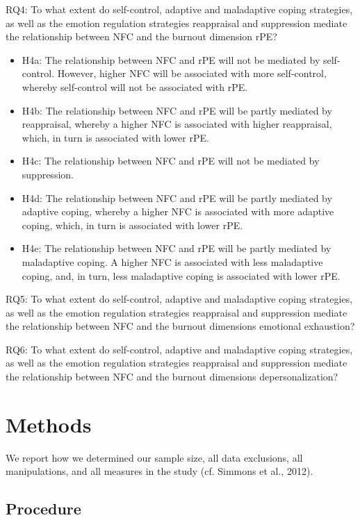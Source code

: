 \documentclass[
  english,
  man]{apa6}
\begin{document}
RQ4: To what extent do self-control, adaptive and maladaptive coping strategies, as well as the emotion regulation strategies reappraisal and suppression mediate the relationship between NFC and the burnout dimension rPE?

\begin{itemize}
\item
  H4a: The relationship between NFC and rPE will not be mediated by self-control. However, higher NFC will be associated with more self-control, whereby self-control will not be associated with rPE.
\item
  H4b: The relationship between NFC and rPE will be partly mediated by reappraisal, whereby a higher NFC is associated with higher reappraisal, which, in turn is associated with lower rPE.
\item
  H4c: The relationship between NFC and rPE will not be mediated by suppression.
\item
  H4d: The relationship between NFC and rPE will be partly mediated by adaptive coping, whereby a higher NFC is associated with more adaptive coping, which, in turn is associated with lower rPE.
\item
  H4e: The relationship between NFC and rPE will be partly mediated by maladaptive coping. A higher NFC is associated with less maladaptive coping, and, in turn, less maladaptive coping is associated with lower rPE.
\end{itemize}

RQ5: To what extent do self-control, adaptive and maladaptive coping strategies, as well as the emotion regulation strategies reappraisal and suppression mediate the relationship between NFC and the burnout dimensions emotional exhaustion?

RQ6: To what extent do self-control, adaptive and maladaptive coping strategies, as well as the emotion regulation strategies reappraisal and suppression mediate the relationship between NFC and the burnout dimensions depersonalization?

\section{Methods}\label{methods}

We report how we determined our sample size, all data exclusions, all manipulations, and all measures in the study (cf. Simmons et al., 2012).

\subsection{Procedure}\label{procedure}
\end{document}
